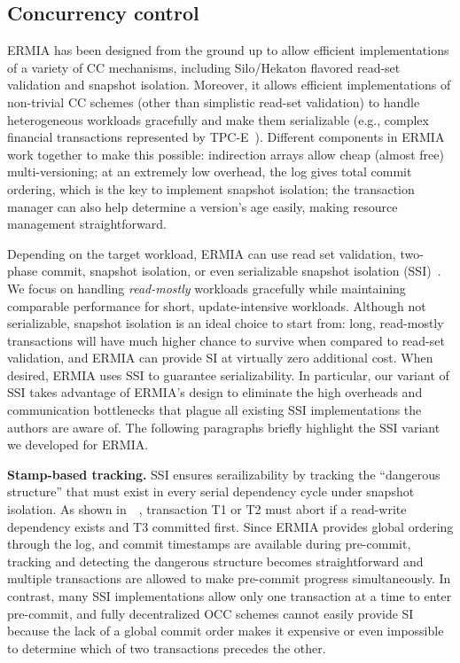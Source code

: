 \subsection{Concurrency control}

ERMIA has been designed from the ground up to allow efficient implementations of a variety of CC mechanisms, including Silo/Hekaton flavored read-set validation and snapshot isolation. Moreover, it allows efficient implementations of non-trivial CC schemes (other than simplistic read-set validation) to handle heterogeneous workloads gracefully and make them serializable (e.g., complex financial transactions represented by TPC-E~\cite{TPCE}). Different components in ERMIA work together to make this possible: indirection arrays allow cheap (almost free) multi-versioning; at an extremely low overhead, the log gives total commit ordering, which is the key to implement snapshot isolation; the transaction manager can also help determine a version's age easily, making resource management straightforward.

Depending on the target workload, ERMIA can use read set validation, two-phase commit, snapshot isolation, or even serializable snapshot isolation (SSI)~\cite{Cahill08RF}. We focus on handling \textit{read-mostly} workloads gracefully while maintaining comparable performance for short, update-intensive workloads. Although not serializable, snapshot isolation is an ideal choice to start from: long, read-mostly transactions will have much higher chance to survive when compared to read-set validation, and ERMIA can provide SI at virtually zero additional cost. When desired, ERMIA uses SSI to guarantee serializability. In particular, our variant of SSI takes advantage of ERMIA's design to eliminate the high overheads and communication bottlenecks that plague all existing SSI implementations the authors are aware of. The following paragraphs briefly highlight the SSI variant we developed for ERMIA.


{\bf Stamp-based tracking.}
SSI ensures serailizability by tracking the ``dangerous structure'' that must exist in every serial dependency cycle under snapshot isolation. As shown in~~\cite{Cahill08RF}, transaction T1 or T2 must abort if a read-write dependency exists and T3 committed first. Since ERMIA provides global ordering through the log, and commit timestamps are available during pre-commit, tracking and detecting the dangerous structure becomes straightforward and multiple transactions are allowed to make pre-commit progress simultaneously. In contrast, many SSI implementations allow only one transaction at a time to enter pre-commit, and fully decentralized OCC schemes cannot easily provide SI because the lack of a global commit order makes it expensive or even impossible to determine which of two transactions precedes the other.

